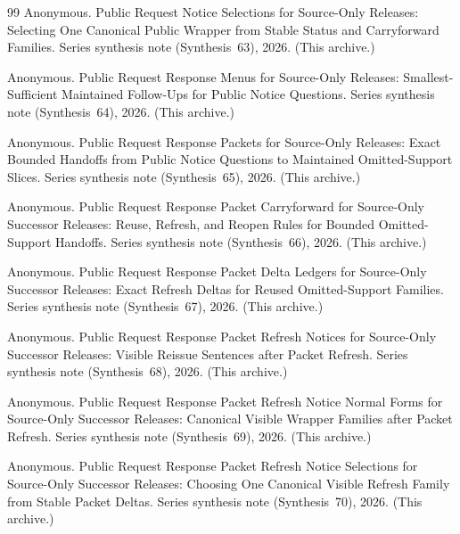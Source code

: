 \documentclass[11pt]{article}
\begin{document}
\begin{thebibliography}{99}
Anonymous.
\newblock Public Request Notice Selections for Source-Only Releases: Selecting One Canonical Public Wrapper from Stable Status and Carryforward Families.
\newblock Series synthesis note (Synthesis~63), 2026. (This archive.)

Anonymous.
\newblock Public Request Response Menus for Source-Only Releases: Smallest-Sufficient Maintained Follow-Ups for Public Notice Questions.
\newblock Series synthesis note (Synthesis~64), 2026. (This archive.)

Anonymous.
\newblock Public Request Response Packets for Source-Only Releases: Exact Bounded Handoffs from Public Notice Questions to Maintained Omitted-Support Slices.
\newblock Series synthesis note (Synthesis~65), 2026. (This archive.)

Anonymous.
\newblock Public Request Response Packet Carryforward for Source-Only Successor Releases: Reuse, Refresh, and Reopen Rules for Bounded Omitted-Support Handoffs.
\newblock Series synthesis note (Synthesis~66), 2026. (This archive.)

Anonymous.
\newblock Public Request Response Packet Delta Ledgers for Source-Only Successor Releases: Exact Refresh Deltas for Reused Omitted-Support Families.
\newblock Series synthesis note (Synthesis~67), 2026. (This archive.)

Anonymous.
\newblock Public Request Response Packet Refresh Notices for Source-Only Successor Releases: Visible Reissue Sentences after Packet Refresh.
\newblock Series synthesis note (Synthesis~68), 2026. (This archive.)

Anonymous.
\newblock Public Request Response Packet Refresh Notice Normal Forms for Source-Only Successor Releases: Canonical Visible Wrapper Families after Packet Refresh.
\newblock Series synthesis note (Synthesis~69), 2026. (This archive.)

Anonymous.
\newblock Public Request Response Packet Refresh Notice Selections for Source-Only Successor Releases: Choosing One Canonical Visible Refresh Family from Stable Packet Deltas.
\newblock Series synthesis note (Synthesis~70), 2026. (This archive.)


\end{thebibliography}
\end{document}
